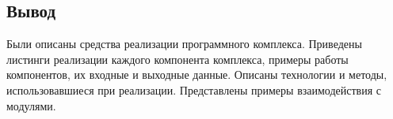 \subsection*{Вывод}

Были описаны средства реализации программного комплекса. Приведены листинги реализации каждого компонента комплекса, примеры работы компонентов, их входные и выходные данные. Описаны технологии и методы, использовавшиеся при реализации. Представлены примеры взаимодействия с модулями.